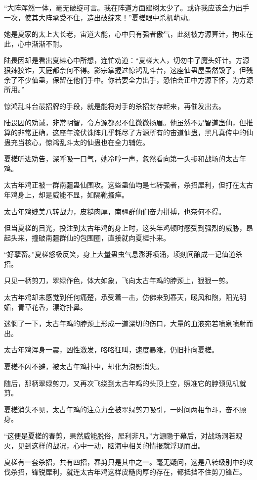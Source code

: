 \begin{this_body}
“大阵浑然一体，毫无破绽可言。我在阵道方面建树太少了。或许我应该全力出手一次，使其大阵承受不住，造出破绽来！”夏槎眼中杀机萌动。

她是夏家的太上大长老，宙道大能，心中只有强者傲气，此刻被方源算计，拘束在此，心中渐渐不耐。

陆畏因却是看出夏槎心中所想，连忙劝道：“夏槎大人，切勿中了魔头奸计。方源狠辣狡诈，天庭都奈何不得。影宗掌握过惊鸿乱斗台，这座仙蛊屋虽然毁了，但残余了不少仙蛊，保留在他们手中。你若要全力出手，恐怕会正中方源下怀，为方源所用。”

惊鸿乱斗台最招牌的手段，就是能将对手的杀招封存起来，再催发出去。

陆畏因的劝诫，非常明智，令方源都忍不住微微扬眉。他虽然不是智道蛊仙，但推算的非常正确，这座年流伏诛阵几乎耗尽了方源所有的宙道仙蛊，黑凡真传中的仙蛊充当核心，惊鸿乱斗太的仙蛊也在全力辅佐。

夏槎听进劝告，深呼吸一口气，她冷哼一声，忽然看向第一头掺和战场的太古年鸡。

太古年鸡正被一群南疆蛊仙围攻。这些蛊仙均是七转强者，杀招犀利，但打在太古年鸡身上，却是威能不显，如隔靴搔痒。

太古年鸡媲美八转战力，皮糙肉厚，南疆群仙们奋力拼搏，也奈何不得。

但当夏槎的目光，投注到太古年鸡的身上时，这头年鸡顿时感受到强烈的威胁，昂起头来，撞破南疆群仙的包围圈，直接就向夏槎扑来。

“好孽畜。”夏槎怒极反笑，身上大量蛊虫气息澎湃喷涌，顷刻间酿成一记仙道杀招。

只见一柄剪刀，翠绿作色，体大如象，飞向太古年鸡的脖颈上，狠狠一剪。

太古年鸡却未感觉到任何痛楚，承受着一击，仿佛来到春天，暖风和煦，阳光明媚，青草花香，漂游扑鼻。

迷惘了一下，太古年鸡的脖颈上形成一道深切的伤口，大量的血液宛若喷泉喷射而出。

太古年鸡浑身一震，凶性激发，咯咯狂叫，速度暴涨，仍旧扑向夏槎。

夏槎不闪不避，被太古年鸡扑中，却化为泡影消失。

随后，那柄翠绿剪刀，又再次飞绕到太古年鸡的头顶上空，照准它的脖颈见机就剪。

夏槎消失不见，太古年鸡的注意力全被翠绿剪刀吸引，一时间两相争斗，奋不顾身。

“这便是夏槎的春剪，果然威能脱俗，犀利非凡。”方源隐于幕后，对战场洞若观火，见到这样的战况，心中一动，脑海中相关的情报就浮现而出。

夏槎有一套杀招，共有四招，春剪只是其中之一。毫无疑问，这是八转级别中的攻伐杀招，锋锐犀利，就连太古年鸡这样皮糙肉厚的存在，都抵挡不住剪刀锋芒。


\end{this_body}
